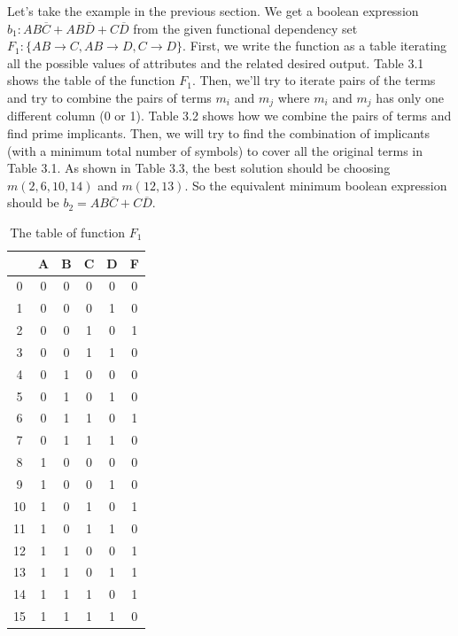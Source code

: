\documentclass[11pt]{book}
\begin{document}
Let's take the example in the previous section. We get a boolean expression $b_1: AB\overline{C} + AB\overline{D} + C\overline{D}$ from the given functional dependency set $F_1: \{ AB \rightarrow C, AB \rightarrow D, C \rightarrow D \}$. First, we write the function as a table iterating all the possible values of attributes and the related desired output. Table 3.1 shows the table of the function $F_1$. Then, we'll try to iterate pairs of the terms and try to combine the pairs of terms $m_i$ and $m_j$ where $m_i$ and $m_j$ has only one different column (0 or 1). Table 3.2 shows how we combine the pairs of terms and find prime implicants. Then, we will try to find the combination of implicants (with a minimum total number of symbols) to cover all the original terms in Table 3.1. As shown in Table 3.3, the best solution should be choosing $m(2, 6, 10, 14)$ and $m(12, 13)$. So the equivalent minimum boolean expression should be $b_2 = AB\overline{C} + C\overline{D}$. 

\begin{table}
	\centering
	
	\begin{tabular}{ |c|c|c|c|c|c| }
		\hline
		  & A & B & C & D & F \\
		\hline
		 0 & 0 & 0 & 0 & 0 & 0 \\
		 1 & 0 & 0 & 0 & 1 & 0 \\
		 2 & 0 & 0 & 1 & 0 & 1 \\
		 3 & 0 & 0 & 1 & 1 & 0 \\
		 4 & 0 & 1 & 0 & 0 & 0 \\
		 5 & 0 & 1 & 0 & 1 & 0 \\
		 6 & 0 & 1 & 1 & 0 & 1 \\
		 7 & 0 & 1 & 1 & 1 & 0 \\
		 8 & 1 & 0 & 0 & 0 & 0 \\
		 9 & 1 & 0 & 0 & 1 & 0 \\
		10 & 1 & 0 & 1 & 0 & 1 \\
		11 & 1 & 0 & 1 & 1 & 0 \\
		12 & 1 & 1 & 0 & 0 & 1 \\
		13 & 1 & 1 & 0 & 1 & 1 \\
		14 & 1 & 1 & 1 & 0 & 1 \\
		15 & 1 & 1 & 1 & 1 & 0 \\			
		\hline
	\end{tabular}

	\caption{The table of function $F_1$}
\end{table}
\end{document}
